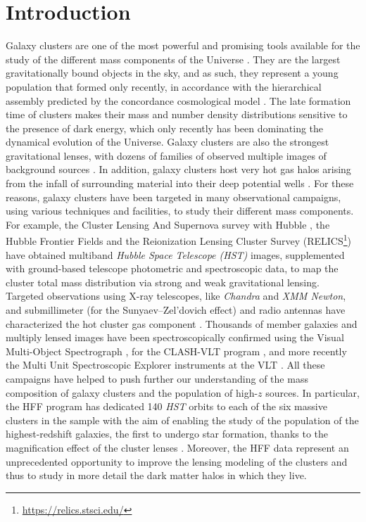 \documentclass[twocolumn]{aastex61}
\begin{document}
\section{Introduction} \label{sec:intro}
Galaxy clusters are one of the most powerful and promising tools available for the
study of the different mass components of the Universe \citep{Voit2005,Jullo2010,Kneib2011,Laureijs2011,Postman2012}.
They are the largest gravitationally bound objects in the sky, and as such, they
represent a young population that formed only recently, in accordance with the
hierarchical assembly predicted by the concordance cosmological model
\citep[e.g.,][]{Tormen1997,Klypin1999,Moore1999,Springel2001}.
The late formation time of clusters makes their mass and number density
distributions sensitive to the presence of dark energy, which only recently
has been dominating the dynamical evolution of the Universe.
Galaxy clusters are also the strongest gravitational
lenses, with dozens of families of observed multiple images of background
sources \citep{Broadhurst2005,Halkola2006}.
In addition, galaxy clusters host very hot gas halos arising from the infall of surrounding
material into their deep potential wells \citep{Sarazin1988,Ettori2013}.
For these reasons, galaxy clusters have been targeted in many observational
campaigns, using various techniques and facilities, to study their different
mass components.
For example, the Cluster Lensing And Supernova survey with Hubble
\citep[CLASH;][]{Postman2012}, the Hubble Frontier Fields \citep[HFF;][]{Lotz2017}
and the Reionization Lensing Cluster Survey (RELICS\footnote{\url{https://relics.stsci.edu/}})
have obtained multiband \emph{Hubble Space Telescope (HST)} images, supplemented with ground-based
telescope photometric and spectroscopic data, to map the cluster total mass distribution via strong and weak
gravitational lensing.
Targeted observations using X-ray telescopes, like \emph{Chandra} and \emph{XMM Newton},
and submillimeter (for the Sunyaev–Zel'dovich effect) and radio antennas have
characterized the hot cluster gas component
\citep[e.g.,][]{Donahue2014,Ogrean2016,Rumsey2016,vanWeeren2017}.
Thousands of member galaxies and multiply lensed images have been
spectroscopically confirmed using the Visual Multi-Object Spectrograph
\citep{LeFevre2003}, for the CLASH-VLT program \citep{Rosati2014}, and
more recently the Multi Unit Spectroscopic Explorer \citep[MUSE;][]{Bacon2012} 
instruments at the VLT \citep[e.g.,][]{Biviano2013,Karman2017,Monna2017}.
All these campaigns have helped to push further our understanding of the mass
composition of galaxy clusters and the population of high-$z$ sources.
In particular, the HFF program has dedicated 140 \emph{HST} orbits to each of
the six massive clusters in the sample with the aim of enabling the study of the
population of the highest-redshift galaxies, the first to undergo star
formation, thanks to the magnification effect of the cluster lenses
\citep[e.g.,][]{Balestra2013,Coe2015,Oesch2015,Vanzella2017}.
Moreover, the HFF data represent an unprecedented opportunity to improve the
lensing modeling of the clusters and thus to study in more detail the dark
matter halos in which they live.
\end{document}
